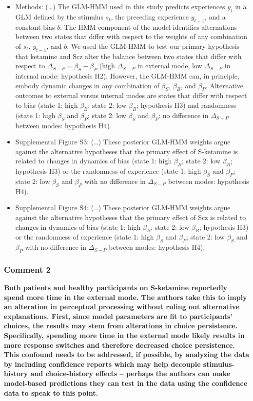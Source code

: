 \documentclass[
]{article}
\begin{document}
\begin{itemize}
\item
  Methods: (\ldots) The GLM-HMM used in this study predicts experiences
  \(y_t\) in a GLM defined by the stimulus \(s_t\), the preceding
  experience \(y_{t-1}\), and a constant bias \(b\). The HMM component
  of the model identifies alternations between two states that differ
  with respect to the weights of any combination of \(s_t\),
  \(y_{t-1}\), and \(b\). We used the GLM-HMM to test our primary
  hypothesis that ketamine and Scz alter the balance between two states
  that differ with respect to \(\Delta_{S-P} = \beta_S - \beta_P\) (high
  \(\Delta_{S-P}\) in external mode, low \(\Delta_{S-P}\) in internal
  mode: hypothesis H2). However, the GLM-HMM can, in principle, embody
  dynamic changes in any combination of \(\beta_S\), \(\beta_B\), and
  \(\beta_P\). Alternative outcomes to external versus internal modes
  are states that differ with respect to bias (state 1: high
  \(\beta_B\); state 2: low \(\beta_B\); hypothesis H3) and randomness
  (state 1: high \(\beta_S\) and \(\beta_P\); state 2: low \(\beta_S\)
  and \(\beta_P\): no difference in \(\Delta_{S-P}\) between modes:
  hypothesis H4).
\item
  Supplemental Figure S3: (\ldots) These posterior GLM-HMM weights argue
  against the alternative hypotheses that the primary effect of
  S-ketamine is related to changes in dynamics of bias (state 1: high
  \(\beta_B\); state 2: low \(\beta_B\); hypothesis H3) or the
  randomness of experience (state 1: high \(\beta_S\) and \(\beta_P\);
  state 2: low \(\beta_S\) and \(\beta_P\) with no difference in
  \(\Delta_{S-P}\) between modes: hypothesis H4).
\item
  Supplemental Figure S4: (\ldots) These posterior GLM-HMM weights argue
  against the alternative hypotheses that the primary effect of Scz is
  related to changes in dynamics of bias (state 1: high \(\beta_B\);
  state 2: low \(\beta_B\); hypothesis H3) or the randomness of
  experience (state 1: high \(\beta_S\) and \(\beta_P\); state 2: low
  \(\beta_S\) and \(\beta_P\) with no difference in \(\Delta_{S-P}\)
  between modes: hypothesis H4).
\end{itemize}

\subsubsection{Comment 2}\label{comment-2-2}

\textbf{Both patients and healthy participants on S-ketamine reportedly
spend more time in the external mode. The authors take this to imply an
alteration in perceptual processing without ruling out alternative
explanations. First, since model parameters are fit to participants'
choices, the results may stem from alterations in choice persistence.
Specifically, spending more time in the external mode likely results in
more response switches and therefore decreased choice persistence. This
confound needs to be addressed, if possible, by analyzing the data by
including confidence reports which may help decouple stimulus-history
and choice-history effects -- perhaps the authors can make model-based
predictions they can test in the data using the confidence data to speak
to this point.}
\end{document}
